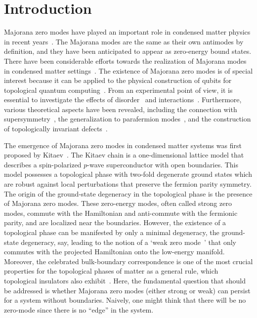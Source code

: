 \documentclass[aps, prb, showpacs, twocolumn, %
amssymb,superscriptaddress]{revtex4}
\begin{document}
\section{Introduction}
\label{sec:intro}

Majorana zero modes have played an important role in condensed matter physics in recent years~\cite{Wilczek09,Alicea12,LeijnseFlensberg12,ElliottFranz15}. The Majorana modes are the same as their own antimodes by definition, and they have been anticipated to appear as zero-energy bound states. There have been considerable efforts towards the realization of Majorana modes in condensed matter settings~\cite{Mourik-12, Rokhinson-12, Das-12, DengYu-12, Finck-13, Churchill-13, Nadj-Perge-14, Higginbotham-15}. The existence of Majorana zero modes is of special interest because it can be applied to the physical construction of qubits for topological quantum computing~\cite{Ivanov-01, Nayak-08, Pachos-12}. From an experimental point of view, it is essential to investigate the effects of disorder~\cite{Brouwer-11, Lobos-12, DeGottardi-14, Altland-14, Crepin-14} and interactions~\cite{FidkowskiKitaev10, FidkowskiKitaev11, Turner11, Gurarie11, Gangadharaiah-11, Stoudenmire-11, Hassler-12, Thomale-13, Katsura_Int_Majorana, Rahmani-15-L, Rahmani-15-B, Gergs-16}. Furthermore, various theoretical aspects have been revealed, including the connection with supersymmetry~\cite{Grover-14, Jian-15, Rahmani-15-L, Rahmani-15-B, Hsieh-16}, the generalization to parafermion modes~\cite{Fendley12, Clarke-14, KlinovajaLoss14, Mong-14, Jermyn-14, Aris-15, Alicea-16, Iemini-16}, and the construction of topologically invariant defects~\cite{Aasen-16}.

The emergence of Majorana zero modes in condensed matter systems  
was first proposed by Kitaev~\cite{Kitaev01}. The Kitaev chain is a one-dimensional lattice model that describes a spin-polarized $p$-wave superconductor with open boundaries. This model possesses a topological phase with two-fold degenerate ground states which are robust against local perturbations that preserve the fermion parity symmetry. 
The origin of the ground-state degeneracy in the topological phase is the presence of Majorana zero modes. These zero-energy modes, often called strong zero modes,  commute with the Hamiltonian and anti-commute with the fermionic parity, and are localized near the boundaries. However, the existence of a topological phase can be manifested by only a minimal degeneracy, the ground-state degeneracy, say, leading to the notion of a `weak zero mode~\cite{Alicea-16}' that only commutes with the projected Hamiltonian onto the low-energy manifold. 
Moreover, the celebrated bulk-boundary correspondence is one of the most crucial properties for the topological phases of matter as a general rule, which topological insulators also exhibit~\cite{HasanKane10, QiZhang11, shortcourse topo.ins.}. Here, the fundamental question that should be addressed is whether Majorana zero modes (either strong or weak) can persist for a system without boundaries. Naively, one might think that there will be no zero-mode since there is no ``edge'' in the system.
\end{document}

